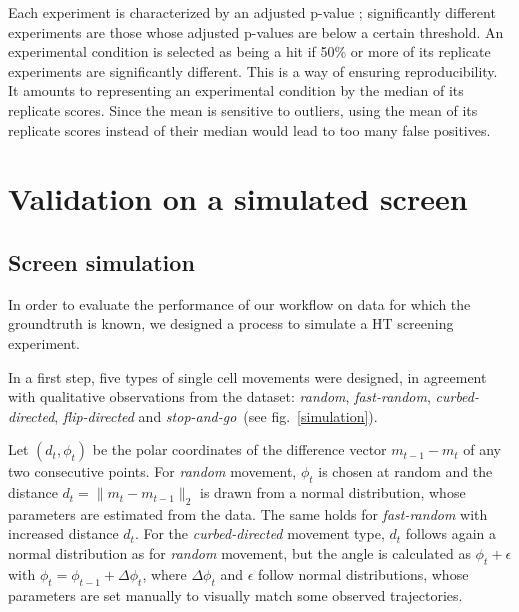 Each experiment is characterized by an adjusted p-value ; significantly different experiments are those whose adjusted p-values are below a certain threshold. An experimental condition is selected as being a hit if 50\% or more of its replicate experiments are significantly different. This is a way of ensuring reproducibility. It amounts to representing an experimental condition by the median of its replicate scores. Since the mean is sensitive to outliers, using the mean of its replicate scores instead of their median would lead to too many false positives.

\section{Validation on a simulated screen}
\label{sec:simulation}
\subsection{Screen simulation}
In order to evaluate the performance of our workflow on data for which the groundtruth is
known, we designed a process to simulate a HT screening
experiment. 

In a first step, five types of single cell movements were designed, in
agreement with qualitative observations from the dataset: \textit{random}, \textit{fast-random}, \textit{curbed-directed}, \textit{flip-directed} and \textit{stop-and-go}~(see fig.~\ref{simulation}). 


Let $(d_t,\phi_t)$ be the polar coordinates of the difference vector $m_{t-1}-m_t$
of any two consecutive
points. For \textit{random} movement, $\phi_t$ is
chosen at random and the distance $d_t=\|m_t-m_{t-1}\|_2$ is
drawn from a normal distribution, whose parameters are estimated from
the data. The same holds for \textit{fast-random} with increased
distance $d_t$. For the \textit{curbed-directed} movement type, $d_t$
follows again a normal distribution as for \textit{random} movement,
but the angle is calculated as $\phi_t + \epsilon$ with $\phi_t =
\phi_{t-1} + \Delta \phi_t$, where $\Delta \phi_t$ and $\epsilon$
follow normal distributions, whose parameters are set manually to
visually match some observed trajectories. 

